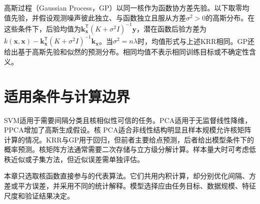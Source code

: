 高斯过程（Gaussian Process，GP）以同一核作为函数协方差先验。以下取零均值先验，并假设观测噪声彼此独立、与函数独立且服从方差$\sigma^2>0$的高斯分布。在这些条件下，后验均值为$\bm k_{\bm x}^{\mathsf T}(K+\sigma^2I)^{-1}\bm y$，潜在函数后验方差为$k(\bm x,\bm x)-\bm k_{\bm x}^{\mathsf T}(K+\sigma^2I)^{-1}\bm k_{\bm x}$。当$\sigma^2=n\lambda$时，均值形式与上述KRR相同。GP还给出基于高斯先验和似然的预测分布。相同均值不表示相同训练目标或不确定性含义。

\section{适用条件与计算边界}
SVM适用于需要间隔分类且核相似性可信的任务。PCA适用于无监督线性降维，PPCA增加了高斯生成假设。核 PCA适合非线性结构明显且样本规模允许核矩阵计算的情况。KRR与GP用于回归，但前者主要给点预测，后者给出模型条件下的概率预测。核矩阵方法通常需要二次存储与立方级分解计算。样本量大时可考虑低秩近似或子集方法，但近似误差需单独评估。

本章只选取核函数直接参与的代表算法。它们共用内积计算，却分别优化间隔、方差或平方误差，并采用不同的统计解释。模型选择应由任务目标、数据规模、特征尺度和验证结果决定。
